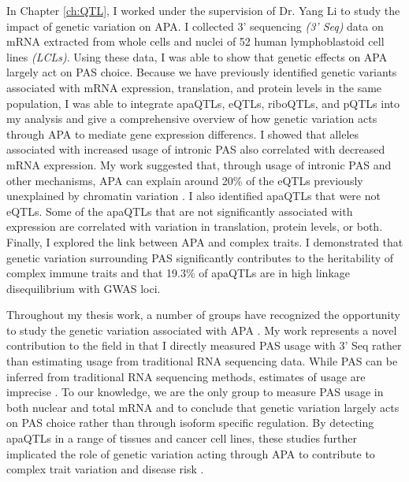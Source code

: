 In Chapter \ref{ch:QTL}, I worked under the supervision of Dr. Yang Li to study the impact of genetic variation on APA. I collected 3' sequencing \emph{(3' Seq)} data on mRNA extracted from whole cells and nuclei of 52 human lymphoblastoid cell lines \emph{(LCLs)}. Using these data, I was able to show that genetic effects on APA largely act on PAS choice. Because we have previously identified genetic variants associated with mRNA expression, translation, and protein levels in the same population, I was able to integrate apaQTLs, eQTLs, riboQTLs, and pQTLs into my analysis and give a comprehensive overview of how genetic variation acts through APA to mediate gene expression differencs. I showed that alleles associated with increased usage of intronic PAS also correlated with decreased mRNA expression. My work suggested that, through usage of intronic PAS and other mechanisms, APA can explain around 20\% of the eQTLs previously unexplained by chromatin variation \citep{li_rna_2016}.  I also identified apaQTLs that were not eQTLs. Some of the apaQTLs that are not significantly associated with expression are correlated with variation in translation, protein levels, or both. Finally, I explored the link between APA and complex traits. I demonstrated that genetic variation surrounding PAS significantly contributes to the heritability of complex immune traits and that 19.3\% of apaQTLs are in high linkage disequilibrium with GWAS loci.  

Throughout my thesis work, a number of groups have recognized the opportunity to study the genetic variation associated with APA  \citep{yang_snp2apa_2019, mariella_length_2019, li_genetic_2019}. My work represents a novel contribution to the field in that I directly measured PAS usage with 3' Seq rather than estimating usage from traditional RNA sequencing data. While PAS can be inferred from traditional RNA sequencing methods, estimates of usage are imprecise \citep{ha_qapa_2018}.  To our knowledge, we are the only group to measure PAS usage in both nuclear and total mRNA and to conclude that genetic variation largely acts on PAS choice rather than through isoform specific regulation. By detecting apaQTLs in a range of tissues and cancer cell lines, these studies further implicated the role of genetic variation acting through APA to contribute to complex trait variation and disease risk \citep{yang_snp2apa_2019, mariella_length_2019, li_genetic_2019}.

